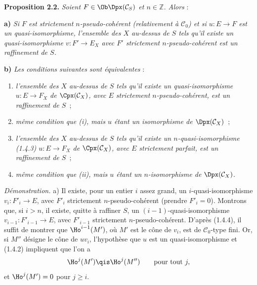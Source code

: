 \textbf{Proposition 2.2.} \emph{Soient \(F\in\Ob\Dpx(\mathcal C_S)\) et \(n\in\mathbb Z\). Alors} :

\textbf{a)} \emph{Si \(F\) est strictement \(n\)-pseudo-cohérent (relativement à \(\mathcal C_0\)) et si \(u:E\to F\) est un quasi-isomorphisme, l'ensemble des \(X\) au-dessus de \(S\) tels qu'il existe un quasi-isomorphisme \(v:F'\longrightarrow E_X\) avec \(F'\) strictement \(n\)-pseudo-cohérent est un raffinement de \(S\).}

\textbf{b)} \emph{Les conditions suivantes sont équivalentes} :
\begin{enumerate}[label=(\roman*)]
\item \emph{l'ensemble des \(X\) au-dessus de \(S\) tels qu'il existe un quasi-isomorphisme \(u:E\longrightarrow F_X\) de \(\Cpx(\mathcal C_X)\), avec \(E\) strictement \(n\)-pseudo-cohérent, est un raffinement de \(S\)}~;
\item[\((\mathrm{i}')\)] \emph{même condition que (i), mais \(u\) étant un isomorphisme de \(\Dpx(\mathcal C_X)\)}~;
\item \emph{l'ensemble des \(X\) au-dessus de \(S\) tels qu'il existe un \(n\)-quasi-isomorphisme (1.4.3) \(u:E\longrightarrow F_X\) de \(\Cpx(\mathcal C_X)\), avec \(E\) strictement parfait, est un raffinement de \(S\)}~;
\item[\((\mathrm{ii}')\)] \emph{même condition que (ii), mais \(u\) étant un \(n\)-isomorphisme de \(\Dpx(\mathcal C_X)\)}.
\end{enumerate}

\emph{Démonstration.} a) Il existe, pour un entier \(i\) assez grand, un \(i\)-quasi-isomorphisme \(v_i:F'_i\longrightarrow E\), avec \(F'_i\) strictement \(n\)-pseudo-cohérent (prendre \(F'_i=0\)). Montrons que, si \(i>n\), il existe, quitte à raffiner \(S\), un \((i-1)\)-quasi-isomorphisme \(v_{i-1}:F'_{i-1}\longrightarrow E\), avec \(F'_{i-1}\) strictement \(n\)-pseudo-cohérent. D'après (1.4.4), il suffit de montrer que \(\Ho^{i-1}(M')\), où \(M'\) est le cône de \(v_i\), est de \(\mathcal C_0\)-type fini. Or, si \(M''\) désigne le cône de \(uv_i\), l'hypothèse que \(u\) est un quasi-isomorphisme et (1.4.2) impliquent que l'on a
\[
  \Ho^j(M')\qis \Ho^j(M'')\qquad\text{pour tout }j,
\]
et \(\Ho^j(M')=0\) pour \(j\geq i\).
